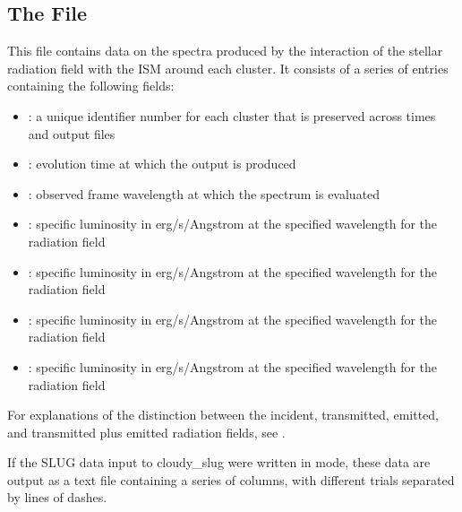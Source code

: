 \documentclass[letterpaper,10pt,english]{sphinxmanual}
\begin{document}
\subsection{The  File}
\label{\detokenize{cloudy:the-cluster-cloudyspec-file}}
This file contains data on the spectra produced by the interaction of
the stellar radiation field with the ISM around each cluster. It
consists of a series of entries containing the following fields:
\begin{itemize}
\item {} 
: a unique identifier number for each cluster that is
preserved across times and output files

\item {} 
: evolution time at which the output is produced

\item {} 
: observed frame wavelength at which the spectrum is evaluated

\item {} 
: specific luminosity in erg/s/Angstrom at the specified
wavelength for the  radiation field

\item {} 
: specific luminosity in erg/s/Angstrom at the specified
wavelength for the  radiation field

\item {} 
: specific luminosity in erg/s/Angstrom at the specified
wavelength for the  radiation field

\item {} 
: specific luminosity in erg/s/Angstrom
at the specified wavelength for the 
radiation field

\end{itemize}

For explanations of the distinction between the incident, transmitted,
emitted, and transmitted plus emitted radiation fields, see
{\hyperref[\detokenize{cloudy:sssec-int-cloudyspec-file}]{}}.

If the SLUG data input to cloudy\_slug were written in  mode,
these data are output as a text file containing a series of columns,
with different trials separated by lines of dashes.
\end{document}
